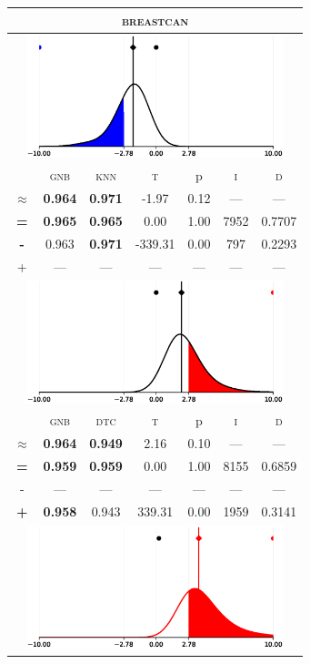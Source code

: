 \begin{tabular}{c||cc||c|c|c||c}
	\toprule
	\multicolumn{7}{c}{\textsc{breastcan}}\\
	\bottomrule
	\multicolumn{7}{c}{\includegraphics[width=7.5cm, trim=30 0 30 0]{figures/breastcan_0.eps}}\\

\midrule	&\textsc{gnb} & \textsc{knn} & \textsc{t} & p & \textsc{i} & \textsc{d}\\
	\color{black} $\approx$ & \color{black} \bfseries 0.964 &\color{black}  \bfseries 0.971 & -1.97 & 0.12 & --- & ---\\\midrule
	{\bfseries\color{black}\tiny=}& \color{black} \bfseries 0.965 & \color{black} \bfseries 0.965 & 0.00 & 1.00 & 7952 & \color{black} 0.7707\\
	{\bfseries\color{blue}\tiny-}& \color{blue}  0.963 & \color{blue} \bfseries 0.971 & -339.31 & 0.00 & 797 & \color{blue} 0.2293\\
	{\tiny+}& --- & --- & --- & --- & --- & ---\\
	\bottomrule
	\multicolumn{7}{c}{\includegraphics[width=7.5cm, trim=30 0 30 0]{figures/breastcan_1.eps}}\\

\midrule	&\textsc{gnb} & \textsc{dtc} & \textsc{t} & p & \textsc{i} & \textsc{d}\\
	\color{black} $\approx$ & \color{black} \bfseries 0.964 &\color{black}  \bfseries 0.949 & 2.16 & 0.10 & --- & ---\\\midrule
	{\bfseries\color{black}\tiny=}& \color{black} \bfseries 0.959 & \color{black} \bfseries 0.959 & 0.00 & 1.00 & 8155 & \color{black} 0.6859\\
	{\tiny-}& --- & --- & --- & --- & --- & ---\\
	{\bfseries\color{red}\tiny+}& \color{red} \bfseries 0.958 & \color{red}  0.943 & 339.31 & 0.00 & 1959 & \color{red} 0.3141\\
	\bottomrule
	\multicolumn{7}{c}{\includegraphics[width=7.5cm, trim=30 0 30 0]{figures/breastcan_2.eps}}\\


\end{tabular}
